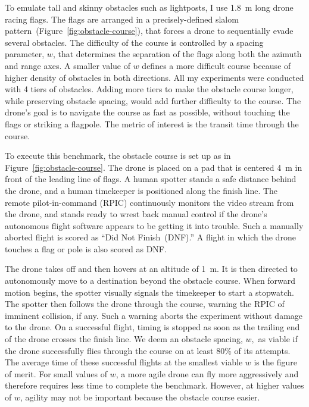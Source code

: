To emulate tall and skinny obstacles such as lightposts, I use 1.8~m
long drone racing flags.  The flags are
arranged in a precisely-defined slalom
pattern~(Figure~\ref{fig:obstacle-course}), that forces a drone to
sequentially evade several obstacles.  The difficulty of the course is
controlled by a spacing parameter, $w$, that determines the separation
of the flags along both the azimuth and range axes.  A smaller value
of $w$ defines a more difficult course because of higher density of
obstacles in both directions.  All my experiments were conducted with
4 tiers of obstacles.  Adding more tiers to make the obstacle course
longer, while preserving obstacle spacing, would add further
difficulty to the course.  The drone's goal is to navigate the course
as fast as possible, without touching the flags or striking a
flagpole.  The metric of interest is the transit time through the
course.

To execute this benchmark, the obstacle course is set up as in
Figure~\ref{fig:obstacle-course}.  The drone is placed on a pad that
is centered 4~m in front of the leading line of flags.  A human
spotter stands a safe distance behind the drone, and a human
timekeeper is positioned along the finish line.  The remote
pilot-in-command (RPIC) continuously monitors the video stream from
the drone, and stands ready to wrest back manual control if the
drone's autonomous flight software appears to be getting it into
trouble.  Such a manually aborted flight is scored as ``Did Not
Finish~(DNF).''  A flight in which the drone touches a flag
or pole is also scored as DNF.

The drone takes off and then hovers at an altitude of 1~m.  It
is then directed to autonomously move to a destination beyond the
obstacle course. When forward motion begins, the spotter visually
signals the timekeeper to start a stopwatch. The spotter then follows
the drone through the course, warning the RPIC of imminent collision,
if any.  Such a warning aborts the experiment without damage to the
drone.  On a successful flight, timing is stopped as soon as the
trailing end of the drone crosses the finish line.  We deem an
obstacle spacing, $w,$ as viable if the drone successfully flies
through the course on at least 80\% of its attempts.  The average time
of these successful flights at the smallest viable $w$ is the figure
of merit. For small values of $w$, a more agile drone can fly more
aggressively and therefore requires less time to complete the benchmark.
However, at higher values of $w$, agility may not be important because
the obstacle course easier.

